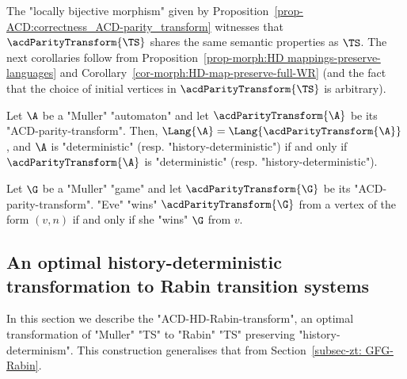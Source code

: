 \documentclass[10pt,a4paper]{amsart}
\begin{document}
The "locally bijective morphism" given by Proposition~\ref{prop-ACD:correctness_ACD-parity_transform} witnesses that $\acdParityTransform{\TS}$ shares the same semantic properties as $\TS$. The next corollaries follow from Proposition~\ref{prop-morph:HD mappings-preserve-languages} and Corollary~\ref{cor-morph:HD-map-preserve-full-WR} (and the fact that the choice of initial vertices in $\acdParityTransform{\TS}$ is arbitrary).

\begin{corollary}
	Let $\A$ be a "Muller" "automaton" and let $\acdParityTransform{\A}$ be its "ACD-parity-transform". Then, $\Lang{\A} = \Lang{\acdParityTransform{\A}}$, and $\A$ is "deterministic" (resp. "history-deterministic") if and only if $\acdParityTransform{\A}$ is "deterministic" (resp. "history-deterministic").
\end{corollary}


\begin{corollary}
	Let $\G$ be a "Muller" "game" and let $\acdParityTransform{\G}$ be its "ACD-parity-transform". "Eve" "wins" $\acdParityTransform{\G}$ from a vertex	of the form $(v,n)$ if and only if she "wins" $\G$ from $v$.
\end{corollary}


\subsection{An optimal history-deterministic transformation to Rabin transition systems}\label{subsec-acd: HD-Rabin-transformation}

In this section we describe the "ACD-HD-Rabin-transform", an optimal transformation of "Muller" "TS" to "Rabin" "TS" preserving "history-determinism". This construction generalises that from Section~\ref{subsec-zt: GFG-Rabin}.
\end{document}

